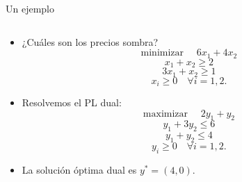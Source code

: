 \documentclass{beamer}
\begin{document}
\begin{frame}{Un ejemplo}
\begin{columns}
\begin{column}{0.6\textwidth}
{\tiny 
\begin{itemize}
        \item ¿Cuáles son los precios sombra?
        \[
        \text{minimizar } \quad 6x_1 + 4x_2
        \]
        \[
        x_1 + x_2 \geq 2
        \]
        \[
        3x_1 + x_2 \geq 1
        \]
        \[
        x_i \geq 0 \quad \forall i = 1, 2.
        \]
    \end{itemize}
    
    \begin{itemize}
        \item Resolvemos el PL dual:
        \[
        \text{maximizar } \quad 2y_1 + y_2
        \]
        \[
        y_1 + 3y_2 \leq 6
        \]
        \[
        y_1 + y_2 \leq 4
        \]
        \[
        y_i \geq 0 \quad \forall i = 1, 2.
        \]
    \end{itemize}
    
    \begin{itemize}
        \item La solución óptima dual es \( y^* = (4, 0) \).
    \end{itemize}
    
}
\end{column}
\end{columns}
\end{frame}
\end{document}
